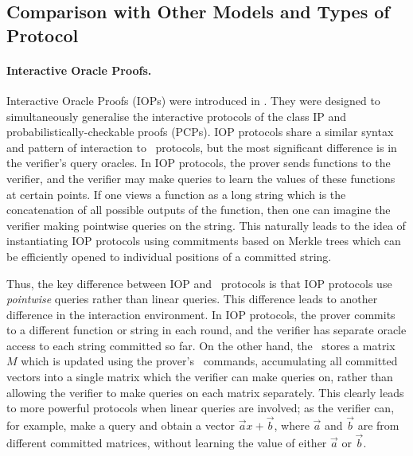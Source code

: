 \subsection{Comparison with Other Models and Types of Protocol}


\paragraph{Interactive Oracle Proofs.} Interactive Oracle Proofs (IOPs) were introduced in \cite{Ben-SassonCS16}. They were designed to simultaneously generalise the interactive protocols of the class IP and probabilistically-checkable proofs (PCPs). IOP protocols share a similar syntax and pattern of interaction to \ILC\ protocols, but the most significant difference is in the verifier's query oracles. In IOP protocols, the prover sends functions to the verifier, and the verifier may make queries to learn the values of these functions at certain points. If one views a function as a long string which is the concatenation of all possible outputs of the function, then one can imagine the verifier making pointwise queries on the string. This naturally leads to the idea of instantiating IOP protocols using commitments based on Merkle trees which can be efficiently opened to individual positions of a committed string. 

Thus, the key difference between IOP and \ILC\ protocols is that IOP protocols use \emph{pointwise} queries rather than linear queries. This difference leads to another difference in the interaction environment. In IOP protocols, the prover commits to a different function or string in each round, and the verifier has separate oracle access to each string committed so far. On the other hand, the \ILC\ stores a matrix $M$ which is updated using the prover's \ILCcommit\ commands, accumulating all committed vectors into a single matrix which the verifier can make queries on, rather than allowing the verifier to make queries on each matrix separately. This clearly leads to more powerful protocols when linear queries are involved; as the verifier can, for example, make a query and obtain a vector $\vec{a}x+\vec{b}$, where $\vec{a}$ and $\vec{b}$ are from different committed matrices, without learning the value of either $\vec{a}$ or $\vec{b}$.

